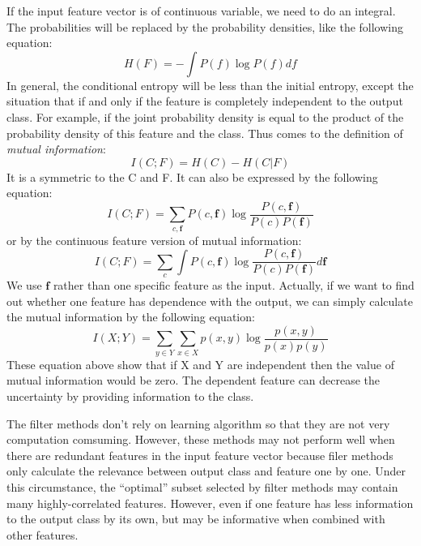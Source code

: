 If the input feature vector is of continuous variable, we need to do an integral. The probabilities will be replaced by the probability densities, like the following equation:
\begin{equation} \label{Eq:continuousEntropy}
H(F) = -\int{P(f)\log{P(f)}}df
\end{equation}
In general, the conditional entropy will be less than the initial entropy, except the situation that if and only if the feature is completely independent to the output class. For example, if the joint probability density is equal to the product of the probability density of this feature and the class. Thus comes to the definition of \textit{mutual information}:
\begin{equation} \label{Eq:MutualInformaion}
I(C;F)=H(C)-H(C|F)
\end{equation}
It is a symmetric to the C and F. It can also be expressed by the following equation:
\begin{equation} \label{Eq:MutualInformaionDiscrete}
I(C;F)=\sum_{c,\bm{f}}{P(c,\bm{f})\log{\frac{P(c,\bm{f})}{P(c)P(\bm{f})}}}
\end{equation}
or by the continuous feature version of mutual information:
\begin{equation} \label{Eq:MutualInformaionContinuous}
I(C;F)=\sum_c{\int{P(c,\bm{f})\log{\frac{P(c,\bm{f})}{P(c)P(\bm{f})}}}d\bm{f}}
\end{equation}
We use $\bm{f}$ rather than one specific feature as the input. Actually, if we want to find out whether one feature has dependence with the output, we can simply calculate the mutual information by the following equation:
\begin{equation} \label{Eq:MutualInformaionDiscrete}
I(X;Y)=\sum_{y\in{Y}}{\sum_{x\in{X}}{p(x,y)\log{\frac{p(x,y)}{p(x)p(y)}}}}
\end{equation}
These equation above show that if X and Y are independent then the value of mutual information would be zero. The dependent feature can decrease the uncertainty by providing information to the class\cite{battiti1994using}.

The filter methods don't rely on learning algorithm so that they are not very computation comsuming. However, these methods may not perform well when there are redundant features in the input feature vector because filer methods only calculate the relevance between output class and feature one by one. Under this circumstance, the ``optimal'' subset selected by filter methods may contain many highly-correlated features. However, even if one feature has less information to the output class by its own, but may be informative when combined with other features\cite{xu2010discriminative}.
